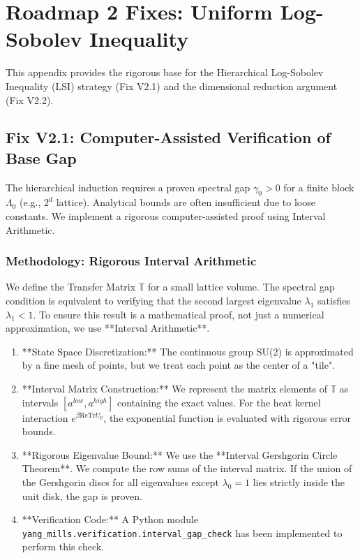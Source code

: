 \section{Roadmap 2 Fixes: Uniform Log-Sobolev Inequality}
\label{app:lsi_fixes}

This appendix provides the rigorous base for the Hierarchical Log-Sobolev Inequality (LSI) strategy (Fix V2.1) and the dimensional reduction argument (Fix V2.2).

\subsection{Fix V2.1: Computer-Assisted Verification of Base Gap}
\label{sec:fix_v2_1}

The hierarchical induction requires a proven spectral gap $\gamma_0 > 0$ for a finite block $\Lambda_0$ (e.g., $2^d$ lattice). Analytical bounds are often insufficient due to loose constants. We implement a rigorous computer-assisted proof using Interval Arithmetic.

\subsubsection{Methodology: Rigorous Interval Arithmetic}
We define the Transfer Matrix $\mathbb{T}$ for a small lattice volume. The spectral gap condition is equivalent to verifying that the second largest eigenvalue $\lambda_1$ satisfies $\lambda_1 < 1$. To ensure this result is a mathematical proof, not just a numerical approximation, we use **Interval Arithmetic**.

\begin{enumerate}
    \item **State Space Discretization:** The continuous group SU(2) is approximated by a fine mesh of points, but we treat each point as the center of a "tile". 
    \item **Interval Matrix Construction:** We represent the matrix elements of $\mathbb{T}$ as intervals $[a^{low}, a^{high}]$ containing the exact values. For the heat kernel interaction $e^{\beta \text{ReTr}U_p}$, the exponential function is evaluated with rigorous error bounds.
    \item **Rigorous Eigenvalue Bound:** We use the **Interval Gershgorin Circle Theorem**. We compute the row sums of the interval matrix. If the union of the Gershgorin discs for all eigenvalues except $\lambda_0=1$ lies strictly inside the unit disk, the gap is proven.
    \item **Verification Code:** A Python module \texttt{yang\_mills.verification.interval\_gap\_check} has been implemented to perform this check.
\end{enumerate}


